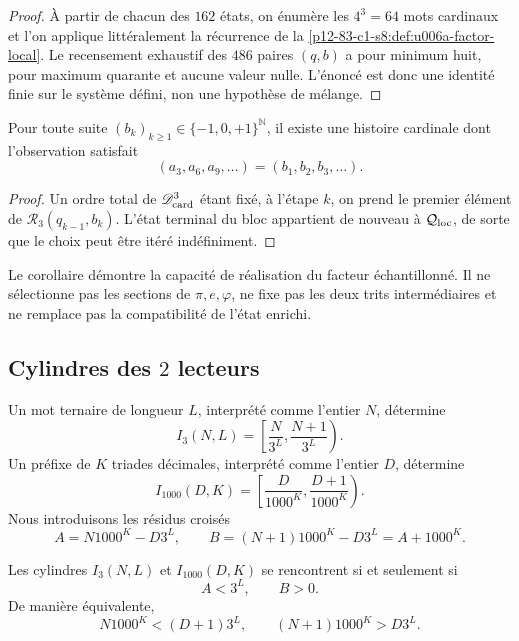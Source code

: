 {\begin{proof}
À partir de chacun des \(162\) états, on énumère les \(4^3=64\) mots
cardinaux et l’on applique littéralement la récurrence de la
\cref{p12-83-c1-s8:def:u006a-factor-local}. Le recensement exhaustif des \(486\) paires
\((q,b)\) a pour minimum huit, pour maximum quarante et aucune valeur nulle.
L’énoncé est donc une identité finie sur le système défini, non
une hypothèse de mélange.
\end{proof}

\begin{corollary}
\label{p12-83-c1-s8:cor:u006a-realizacion-sucesion}
Pour toute suite
\((b_k)_{k\geq1}\in\{-1,0,+1\}^{\mathbb N}\), il existe une histoire cardinale
dont l’observation satisfait
\[
 (a_3,a_6,a_9,\ldots)=(b_1,b_2,b_3,\ldots).
\]
\end{corollary}

\begin{proof}
Un ordre total de \(\mathscr D_{\rm card}^3\) étant fixé, à l’étape \(k\), on
prend le premier élément de \(\mathcal R_3(q_{k-1},b_k)\). L’état terminal
du bloc appartient de nouveau à \(\mathcal Q_{\rm loc}\), de sorte que le
choix peut être itéré indéfiniment.
\end{proof}

Le corollaire démontre la capacité de réalisation du facteur échantillonné. Il ne
sélectionne pas les sections de \(\pi,e,\varphi\), ne fixe pas les deux trits
intermédiaires et ne remplace pas la compatibilité de l’état enrichi.

\subsection{Cylindres des \(2\) lecteurs}

Un mot ternaire de longueur \(L\), interprété comme l’entier \(N\),
détermine
\[
 I_3(N,L)=\left[\frac{N}{3^L},\frac{N+1}{3^L}\right).
\]
Un préfixe de \(K\) triades décimales, interprété comme l’entier \(D\),
détermine
\[
 I_{1000}(D,K)=
 \left[\frac{D}{1000^K},\frac{D+1}{1000^K}\right).
\]
Nous introduisons les résidus croisés
\[
 A=N1000^K-D3^L,
 \qquad
 B=(N+1)1000^K-D3^L=A+1000^K.
\]

\begin{lemma}
\label{p12-83-c1-s8:lem:u006a-criterio-entero}
Les cylindres \(I_3(N,L)\) et \(I_{1000}(D,K)\) se rencontrent si et seulement si
\[
 \boxed{A<3^L,\qquad B>0.}
\]
De manière équivalente,
\[
 N1000^K<(D+1)3^L,
 \qquad
 (N+1)1000^K>D3^L.
\]
\end{lemma}

}
